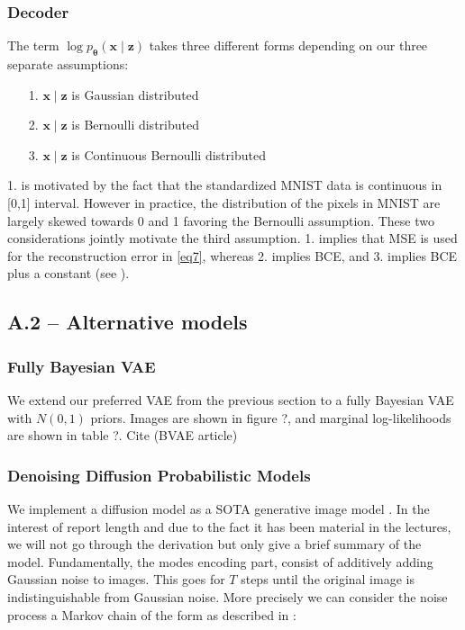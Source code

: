 \subsubsection*{Decoder}
The term  $\log p_{\bm{\theta}}(\mathbf{x} \mid  \mathbf{z})$ takes three different forms depending on our three separate assumptions:
\begin{itemize}
    \item [1.] $\mathbf{x} \mid  \mathbf{z}$ is Gaussian  distributed 
    \item [2.] $\mathbf{x} \mid  \mathbf{z}$ is Bernoulli distributed 
    \item [3.] $\mathbf{x} \mid  \mathbf{z}$ is Continuous Bernoulli  distributed 
\end{itemize}
1. is motivated by the fact that the standardized MNIST data is continuous in [0,1] interval. However in practice, the distribution of the pixels in MNIST are largely skewed towards 0 and 1 favoring the Bernoulli assumption. These two considerations jointly motivate the third assumption. 1. implies that MSE is used for the reconstruction error in \ref{eq7}, whereas 2. implies BCE, and 3. implies BCE plus a constant (see \cite{CB}).

\subsection*{A.2 – Alternative models}
\subsubsection*{Fully Bayesian VAE}
We extend our preferred VAE from the previous section to a fully Bayesian VAE with $N(0,1)$ priors. Images are shown in figure ?, and marginal log-likelihoods are shown in table ?. Cite \cite{BVAE} (BVAE article)

\subsubsection*{Denoising Diffusion Probabilistic Models}
We implement a diffusion model as a SOTA generative image model \cite{diffusion2020}. In the interest of report length and due to the fact it has been material in the lectures, we will not go through the derivation but only give a brief summary of the model. Fundamentally, the modes encoding part, consist of additively adding Gaussian noise to images. This goes for $T$ steps until the original image is indistinguishable from Gaussian noise. More precisely we can consider the noise process a Markov chain of the form as described in \cite[p. 860, eq. 25.1]{pml2Book}:

